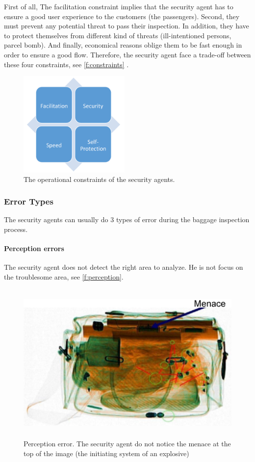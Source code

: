 First of all, The facilitation constraint implies that the security agent has to ensure a good user experience to the customers (the passengers). Second, they must prevent any potential threat to pass their inspection. In addition, they have to protect themselves from different kind of threats (ill-intentioned persons, parcel bomb). And finally, economical reasons oblige them to be fast enough in order to ensure a good flow. Therefore, the security agent face a trade-off between these four constraints, see  \autoref{f:constraints} .
\begin{figure}
\centering
	\includegraphics[height=5.2cm]{Figures/constraints}
	\caption{The operational constraints of the security agents.}
	\label{f:constraints}
\end{figure}



\subsubsection{ Error Types }


The security agents can usually do 3 types of error during the baggage inspection process.

\paragraph{Perception errors}

The security agent does not detect the right area to analyze. He is not focus on the troublesome area, see  \autoref{f:perception}.
\begin{figure}
\centering
	\includegraphics[height=8cm]{Figures/perceptionError}
	\caption{Perception error. The security agent do not notice the menace at the top of the image (the initiating system of an explosive) }
	\label{f:perception}
\end{figure}
